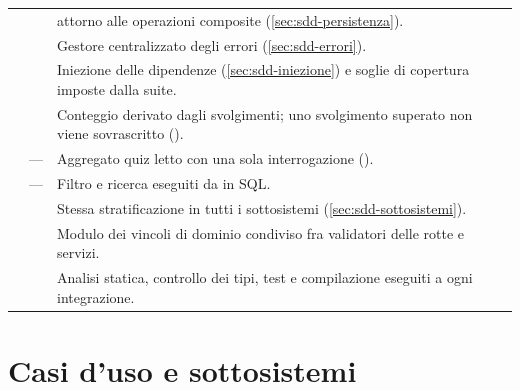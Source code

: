 \begin{longtable}{@{}l l L{9.4cm}@{}}
 &  &
 attorno alle operazioni composite
(\cref{sec:sdd-persistenza}). \\

 &  &
Gestore centralizzato degli errori (\cref{sec:sdd-errori}). \\

 &  &
Iniezione delle dipendenze (\cref{sec:sdd-iniezione}) e soglie di copertura
imposte dalla suite. \\

 &  &
Conteggio derivato dagli svolgimenti; uno svolgimento superato non viene
sovrascritto (). \\
\midrule

 & --- &
Aggregato quiz letto con una sola interrogazione (). \\

 & --- &
Filtro e ricerca eseguiti da  in SQL. \\
\midrule

 &  &
Stessa stratificazione in tutti i sottosistemi
(\cref{sec:sdd-sottosistemi}). \\

 &  &
Modulo dei vincoli di dominio condiviso fra validatori delle rotte e servizi. \\

 &  &
Analisi statica, controllo dei tipi, test e compilazione eseguiti a ogni
integrazione. \\

\end{longtable}

\section{Casi d'uso e sottosistemi}

